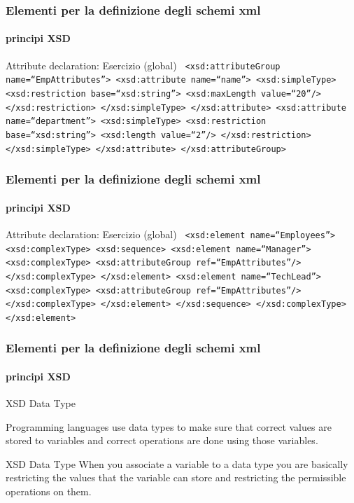 \begin{frame}
	\frametitle{Elementi per la definizione degli schemi xml}
	\framesubtitle{principi XSD}
	\addtocounter{nframe}{1}

	\begin{block}{Attribute declaration: Esercizio (global)}
		\texttt{
			<xsd:attributeGroup name=``EmpAttributes''>
			<xsd:attribute name=``name''>
			<xsd:simpleType>
			<xsd:restriction base=``xsd:string''>
			<xsd:maxLength value=``20''/>
			</xsd:restriction>
			</xsd:simpleType>
			</xsd:attribute>
			<xsd:attribute name=``department''>
			<xsd:simpleType>
			<xsd:restriction base=``xsd:string''>
			<xsd:length value=``2''/>
			</xsd:restriction>
			</xsd:simpleType>
			</xsd:attribute>
			</xsd:attributeGroup>
		}
	\end{block}

\end{frame}


\begin{frame}
	\frametitle{Elementi per la definizione degli schemi xml}
	\framesubtitle{principi XSD}
	\addtocounter{nframe}{1}

	\begin{block}{Attribute declaration: Esercizio (global)}
		\texttt{
			<xsd:element name=``Employees''>
			<xsd:complexType>
			<xsd:sequence>
			<xsd:element name=``Manager''>
			<xsd:complexType>
			<xsd:attributeGroup ref=``EmpAttributes''/>
			</xsd:complexType>
			</xsd:element>
			<xsd:element name=``TechLead''>
			<xsd:complexType>
			<xsd:attributeGroup ref=``EmpAttributes''/>
			</xsd:complexType>
			</xsd:element>
			</xsd:sequence>
			</xsd:complexType>
			</xsd:element>
		}
	\end{block}

\end{frame}


\begin{frame}
	\frametitle{Elementi per la definizione degli schemi xml}
	\framesubtitle{principi XSD}
	\addtocounter{nframe}{1}

	\begin{block}{XSD Data Type}

		Programming languages use data types to make sure that correct values are stored to variables and correct operations are done using those variables.
	\end{block}

	\begin{block}{XSD Data Type}
		When you associate a variable to a data type you are basically restricting the values that the variable can store and restricting the permissible operations on them.
	\end{block}

\end{frame}

